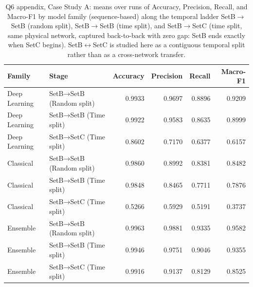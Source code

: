 \begin{table}
\caption{Q6 appendix, Case Study A: means over runs of Accuracy, Precision, Recall, and Macro-F1 by model family (sequence-based) along the temporal ladder SetB$\to$SetB (random split), SetB$\to$SetB (time split), and SetB$\to$SetC (time split, same physical network, captured back-to-back with zero gap: SetB ends exactly when SetC begins). SetB$\leftrightarrow$SetC is studied here as a contiguous temporal split rather than as a cross-network transfer.}
\label{tab:q6_appendix_cs_temporal}
\begin{tabular}{llrrrr}
\toprule
Family & Stage & Accuracy & Precision & Recall & Macro-F1 \\
\midrule
Deep Learning & SetB→SetB (Random split) & 0.9933 & 0.9697 & 0.8896 & 0.9209 \\
Deep Learning & SetB→SetB (Time split) & 0.9922 & 0.9583 & 0.8635 & 0.8999 \\
Deep Learning & SetB→SetC (Time split) & 0.8602 & 0.7170 & 0.6377 & 0.6157 \\
Classical & SetB→SetB (Random split) & 0.9860 & 0.8992 & 0.8381 & 0.8482 \\
Classical & SetB→SetB (Time split) & 0.9848 & 0.8465 & 0.7711 & 0.7876 \\
Classical & SetB→SetC (Time split) & 0.5266 & 0.5929 & 0.5191 & 0.3737 \\
Ensemble & SetB→SetB (Random split) & 0.9963 & 0.9881 & 0.9335 & 0.9582 \\
Ensemble & SetB→SetB (Time split) & 0.9946 & 0.9751 & 0.9046 & 0.9355 \\
Ensemble & SetB→SetC (Time split) & 0.9916 & 0.9137 & 0.8129 & 0.8525 \\
\bottomrule
\end{tabular}
\end{table}
